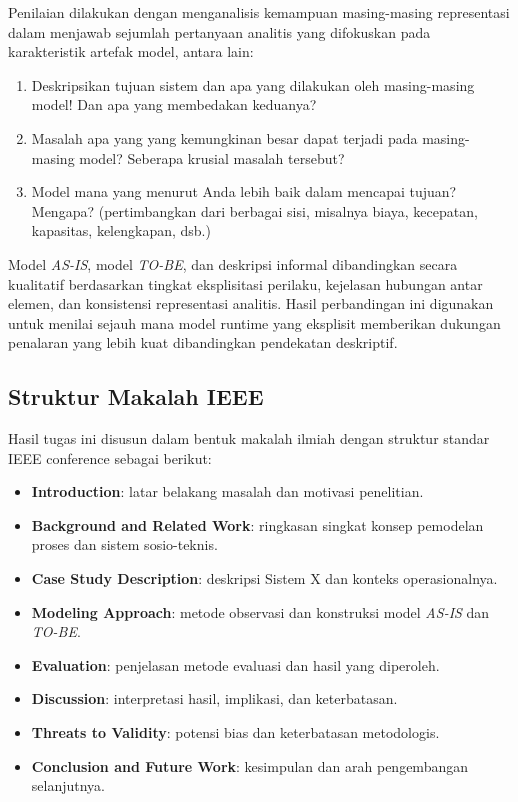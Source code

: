 Penilaian dilakukan dengan menganalisis kemampuan masing-masing representasi dalam menjawab sejumlah pertanyaan analitis yang difokuskan pada karakteristik artefak model, antara lain:
\begin{enumerate}
    \item Deskripsikan tujuan sistem dan apa yang dilakukan oleh masing-masing model! Dan apa yang membedakan keduanya?
    \item Masalah apa yang yang kemungkinan besar dapat terjadi pada masing-masing model? Seberapa krusial masalah tersebut?
    \item Model mana yang menurut Anda lebih baik dalam mencapai tujuan? Mengapa? (pertimbangkan dari berbagai sisi, misalnya biaya, kecepatan, kapasitas, kelengkapan, dsb.)
\end{enumerate}

Model \textit{AS-IS}, model \textit{TO-BE}, dan deskripsi informal dibandingkan secara kualitatif berdasarkan tingkat eksplisitasi perilaku, kejelasan hubungan antar elemen, dan konsistensi representasi analitis. Hasil perbandingan ini digunakan untuk menilai sejauh mana model runtime yang eksplisit memberikan dukungan penalaran yang lebih kuat dibandingkan pendekatan deskriptif.

\subsection*{Struktur Makalah IEEE}

Hasil tugas ini disusun dalam bentuk makalah ilmiah dengan struktur standar IEEE conference sebagai berikut:

\begin{itemize}
    \item \textbf{Introduction}: latar belakang masalah dan motivasi penelitian.
    \item \textbf{Background and Related Work}: ringkasan singkat konsep pemodelan proses dan sistem sosio-teknis.
    \item \textbf{Case Study Description}: deskripsi Sistem X dan konteks operasionalnya.
    \item \textbf{Modeling Approach}: metode observasi dan konstruksi model \textit{AS-IS} dan \textit{TO-BE}.
    \item \textbf{Evaluation}: penjelasan metode evaluasi dan hasil yang diperoleh.
    \item \textbf{Discussion}: interpretasi hasil, implikasi, dan keterbatasan.
    \item \textbf{Threats to Validity}: potensi bias dan keterbatasan metodologis.
    \item \textbf{Conclusion and Future Work}: kesimpulan dan arah pengembangan selanjutnya.
\end{itemize}

